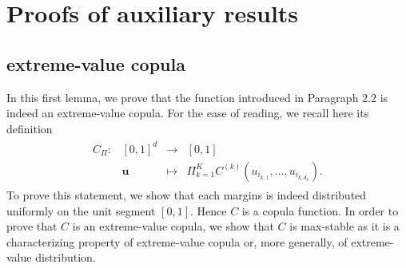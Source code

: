 \documentclass[11pt]{article}
\begin{document}
	\section{Proofs of auxiliary results}
		\subsection{extreme-value copula}
        
        In this first lemma, we prove that the function introduced in Paragraph 2.2 is indeed an extreme-value copula. For the ease of reading, we recall here its definition
        \begin{align*}
			\begin{array}{lrcl}
C_{\Pi} : & [0,1]^d & \longrightarrow & [0,1] \\
    & \textbf{u} & \longmapsto & \Pi_{k=1}^K C^{(k)}(u_{i_{k,1}}, \dots, u_{i_{k,d_k}}). \end{array}
		\end{align*}
		To prove this statement, we show that each margins is indeed distributed uniformly on the unit segment $[0,1]$. Hence $C$ is a copula function. In order to prove that $C$ is an extreme-value copula, we show that $C$ is max-stable as it is a characterizing property of extreme-value copula or, more generally, of extreme-value distribution.
\end{document}
